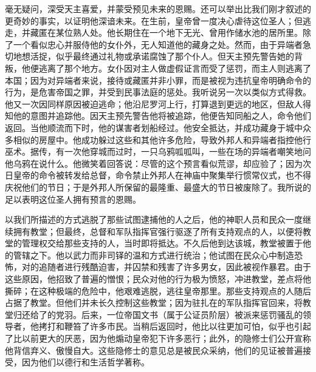 毫无疑问，深受天主喜爱，并蒙受预见未来的恩赐。还可以举出比我们刚才叙述的更奇妙的事实，以证明他深谙未来。在生前，皇帝曾一度决心虐待这位圣人；但逃走，并藏匿在某位熟人处。他长期住在一个地下无光、曾用作储水池的居所里。除了一个看似忠心并服侍他的女仆外，无人知道他的藏身之处。然而，由于异端者急切地想活捉，似乎最终通过礼物或承诺腐蚀了那个仆人。但天主预先警告她的背叛，他便逃离了那个地方。女仆因对主人做虚假证言而受了惩罚，而主人则逃离了本国；因为对异端者来说，接待或藏匿并非小罪，而是被视为违抗皇帝明确命令的行为，是危害帝国之罪，并受到民事法庭的惩处。我听说另一次以类似方式得救。他又一次因同样原因被迫逃命；他沿尼罗河上行，打算退到更远的地区，但敌人得知他的意图并追踪他。因天主预先警告他将被追踪，他便告知同船之人，命令他们返回。当他顺流而下时，他的谋害者划船经过。他安全抵达，并成功藏身于城中众多相似的房屋中。他成功躲过这些和其他许多危险，导致外邦人和异端者指控他行巫术。据传，有一次他穿城而过时，一只乌鸦呱呱叫，一些在场的异端者嘲笑地问他乌鸦在说什么。他微笑着回答说：尽管的这个预言看似荒谬，却应验了；因为次日皇帝的命令被转发给总督，命令禁止外邦人在神庙中聚集举行惯常仪式，也不得庆祝他们的节日；于是外邦人所保留的最隆重、最盛大的节日被废除了。我所说的足以表明这位圣人拥有预言的恩赐。\par

以我们所描述的方式逃脱了那些试图逮捕他的人之后，他的神职人员和民众一度继续拥有教堂；但最终，总督和军队指挥官强行驱逐了所有支持观点的人，以便将教堂的管理权交给那些支持的人，当时即将抵达。不久后他到达该城，教堂被置于他的管辖之下。他以武力而非司铎的温和方式进行统治；他试图在民众心中制造恐怖，对的追随者进行残酷迫害，并囚禁和残害了许多男女，因此被视作暴君。由于这些原因，他招致了普遍的憎恨；民众对他的行为极为愤怒，冲进教堂，差点将他撕碎；在这种极端的危险中，他艰难逃脱，逃往皇帝那里。那些支持观点的人随后占据了教堂。但他们并未长久控制这些教堂；因为驻扎在的军队指挥官回来，将教堂归还给了的党羽。后来，一位帝国文书（属于公证员阶层）被派来惩罚骚乱的领导者，他拷打和鞭笞了许多市民。当稍后返回时，他比以往更加可怕，似乎也引起了比以前更大的厌恶，因为他煽动皇帝犯下许多恶行；此外，的隐修士们公开宣称他背信弃义、傲慢自大。这些隐修士的意见总是被民众采纳，他们的见证被普遍接受，因为他们以德行和生活哲学著称。\par


